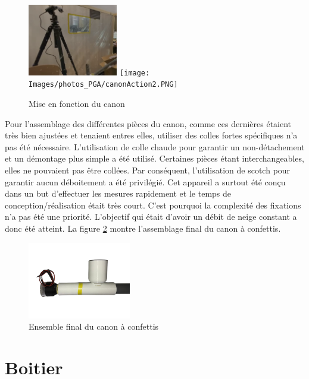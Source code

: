 \begin{figure}[H]
    \centering
    \includegraphics[width=0.35\textwidth]{Images/photos_PGA/canonAction1.PNG}
    \texttt{[image: Images/photos\_PGA/canonAction2.PNG]}
    \caption{Mise en fonction du canon}
    \label{fig:canonupdate}
\end{figure}

Pour l’assemblage des différentes pièces du canon, comme ces dernières étaient très bien ajustées et 
tenaient entres elles, utiliser des colles fortes spécifiques n’a pas été nécessaire. 
L’utilisation de colle chaude pour garantir un non-détachement et un démontage plus simple a été utilisé. 
Certaines pièces étant interchangeables, elles ne pouvaient pas être collées. Par conséquent, l’utilisation de scotch pour 
garantir aucun déboitement a été privilégié. Cet appareil a surtout été conçu dans un but d'effectuer 
les mesures rapidement et le temps de conception/réalisation était très court. C’est pourquoi la complexité 
des fixations n’a pas été une priorité. L’objectif qui était d’avoir un débit de neige constant a donc 
été atteint. La figure \ref{fig:canonensemble} montre l'assemblage final du canon à confettis.

\begin{figure}[H]
    \centering
    \includegraphics[width=0.4\textwidth]{Images/photos_PGA/canonComplpetv2-removebg-preview.png}
    \caption{Ensemble final du canon à confettis}
    \label{fig:canonensemble}
\end{figure}

\newpage
\section{Boitier}

